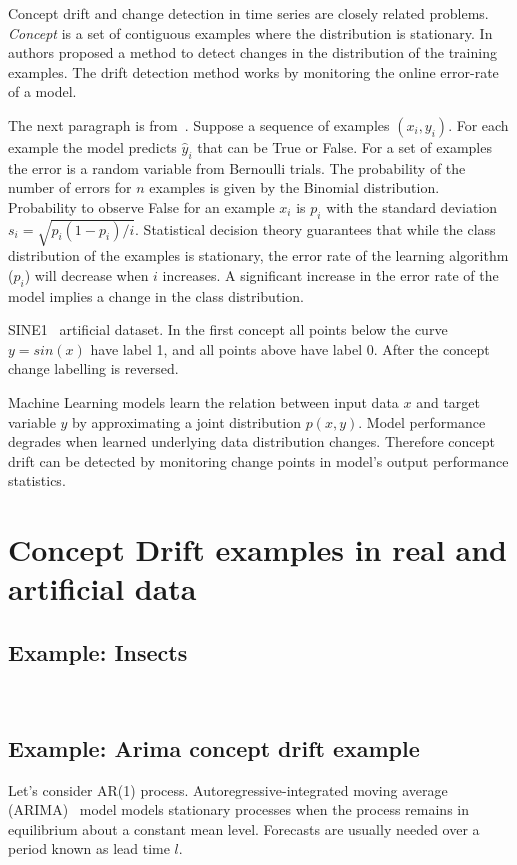 Concept drift and change detection in time series are closely related problems.
\textit{Concept} is a set of contiguous examples where the distribution is stationary.
In~\cite{gama2004learning} authors proposed a method to detect changes in the distribution of the training examples.
The drift detection method works by monitoring the online error-rate of a model.

The next paragraph is from~\cite{gama2004learning}.
Suppose a sequence of examples $(x_i, y_i)$.
For each example the model predicts $\hat y_i$ that can be True or False.
For a set of examples the error is a random variable from Bernoulli trials.
The probability of the number of errors for $n$ examples is given by the Binomial distribution.
Probability to observe False for an example $x_i$ is $p_i$ with the standard deviation $s_i=\sqrt{p_i(1-p_i)/i}$.
Statistical decision theory guarantees that while the class distribution of the examples is stationary, the error rate of the learning algorithm ($p_i$) will decrease when $i$ increases.
A significant increase in the error rate of the model implies a change in the class distribution.

SINE1~\cite{gama2004learning} artificial dataset.
In the first concept all points below the curve $y=sin(x)$ have label 1, and all points above have label 0.
After the concept change labelling is reversed.

Machine Learning models learn the relation between input data $x$ and target
variable $y$ by approximating a joint distribution $p(x,y)$.  Model performance
degrades when learned underlying data distribution changes.  Therefore concept
drift can be detected by monitoring change points in model's output performance
statistics.

\section{Concept Drift examples in real and artificial data}
\subsection{Example: Insects}
~\cite{SouzaChallenges2020}

\subsection{Example: Arima concept drift example}
Let's consider AR(1) process.
Autoregressive-integrated moving average (ARIMA)~\cite{box2015time} model models stationary processes when the process remains in equilibrium about a constant mean level.
Forecasts are usually needed over a period known as lead time $l$.

